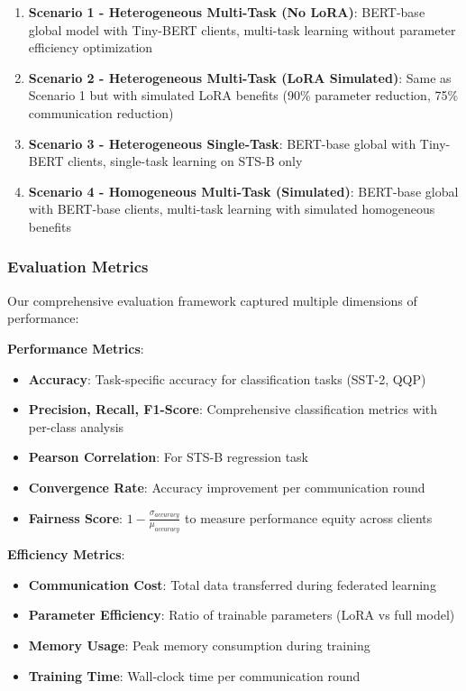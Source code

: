 \begin{enumerate}
    \item \textbf{Scenario 1 - Heterogeneous Multi-Task (No LoRA)}: BERT-base global model with Tiny-BERT clients, multi-task learning without parameter efficiency optimization
    \item \textbf{Scenario 2 - Heterogeneous Multi-Task (LoRA Simulated)}: Same as Scenario 1 but with simulated LoRA benefits (90\% parameter reduction, 75\% communication reduction)
    \item \textbf{Scenario 3 - Heterogeneous Single-Task}: BERT-base global with Tiny-BERT clients, single-task learning on STS-B only
    \item \textbf{Scenario 4 - Homogeneous Multi-Task (Simulated)}: BERT-base global with BERT-base clients, multi-task learning with simulated homogeneous benefits
\end{enumerate}

\subsubsection{Evaluation Metrics}
Our comprehensive evaluation framework captured multiple dimensions of performance:

\textbf{Performance Metrics}:
\begin{itemize}
    \item \textbf{Accuracy}: Task-specific accuracy for classification tasks (SST-2, QQP)
    \item \textbf{Precision, Recall, F1-Score}: Comprehensive classification metrics with per-class analysis
    \item \textbf{Pearson Correlation}: For STS-B regression task
    \item \textbf{Convergence Rate}: Accuracy improvement per communication round
    \item \textbf{Fairness Score}: $1 - \frac{\sigma_{accuracy}}{\mu_{accuracy}}$ to measure performance equity across clients
\end{itemize}

\textbf{Efficiency Metrics}:
\begin{itemize}
    \item \textbf{Communication Cost}: Total data transferred during federated learning
    \item \textbf{Parameter Efficiency}: Ratio of trainable parameters (LoRA vs full model)
    \item \textbf{Memory Usage}: Peak memory consumption during training
    \item \textbf{Training Time}: Wall-clock time per communication round
\end{itemize}

